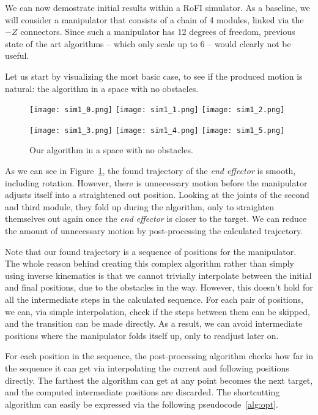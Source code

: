 We can now demostrate initial results within a RoFI simulator. As a baseline, we will consider a manipulator that consists of a chain of 4 modules, linked via the $-Z$ connectors. Since such a manipulator has 12 degrees of freedom, previous state of the art algorithms -- which only scale up to 6 -- would clearly not be useful.

Let us start by visualizing the most basic case, to see if the produced motion is natural: the algorithm in a space with no obstacles.

\begin{figure}
  \centering
  \begin{minipage}{\textwidth}
    \texttt{[image: sim1\_0.png]}
    \texttt{[image: sim1\_1.png]}
    \texttt{[image: sim1\_2.png]}

    \texttt{[image: sim1\_3.png]}
    \texttt{[image: sim1\_4.png]}
    \texttt{[image: sim1\_5.png]}
  \end{minipage}
  \caption{Our algorithm in a space with no obstacles.}\label{fig:sim1}
\end{figure}

As we can see in Figure~\ref{fig:sim1}, the found trajectory of the \textit{end effector} is smooth, including rotation. However, there is unnecessary motion before the manipulator adjusts itself into a straightened out position. Looking at the joints of the second and third module, they fold up during the algorithm, only to straighten themselves out again once the \textit{end effector} is closer to the target. We can reduce the amount of unnecessary motion by post-processing the calculated trajectory.

Note that our found trajectory is a sequence of positions for the manipulator. The whole reason behind creating this complex algorithm rather than simply using inverse kinematics is that we cannot trivially interpolate between the initial and final positions, due to the obstacles in the way. However, this doesn't hold for all the intermediate steps in the calculated sequence. For each pair of positions, we can, via simple interpolation, check if the steps between them can be skipped, and the transition can be made directly. As a result, we can avoid intermediate positions where the manipulator folds itself up, only to readjust later on.

For each position in the sequence, the post-processing algorithm checks how far in the sequence it can get via interpolating the current and following positions directly. The farthest the algorithm can get at any point becomes the next target, and the computed intermediate positions are discarded. The shortcutting algorithm can easily be expressed via the following pseudocode~\ref{alg:opt}.


